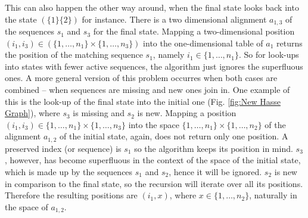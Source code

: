 \documentclass[a4paper,10pt]{thesis}
\begin{document}
{{{{        \gapSmall
        This can also happen the other way around, when the final state looks back into the state $(\{1\}\{2\})$ for instance. There is a two dimensional alignment $a_{1,3}$ of the sequences $s_1$ and $s_3$ for the final state. Mapping a two-dimensional position $(i_1,i_3)\in(\{1,\dots,n_1\}\times\{1,\dots,n_3\})$ into the one-dimensional table of $a_1$ returns the position of the matching sequence $s_1$, namely $i_1\in\{1,\dots,n_1\}$. So for look-ups into states with fewer active sequences, the algorithm just ignores the superfluous ones. 
        \gapSmall
        A more general version of this problem occurres when both cases are combined -- when sequences are missing and new ones join in. One example of this is the look-up of the final state into the initial one (Fig. \ref{fig:New Hasse Graph}), where $s_3$ is missing and $s_2$ is new. Mapping a position $(i_1,i_3)\in\{1,\dots,n_1\}\times\{1,\dots,n_3\}$ into the space $\{1,\dots,n_1\}\times\{1,\dots,n_2\}$ of the alignment $a_{1,2}$ of the initial state, again, does not return only one position. A preserved index (or sequence) is $s_1$ so the algorithm keeps its position in mind. $s_3$, however, has become superfluous in the context of the space of the initial state, which is made up by the sequences $s_1$ and $s_2$, hence it will be ignored. $s_2$ is new in comparison to the final state, so the recursion will iterate over all its positions. Therefore the resulting positions are $(i_1,x)$, where $x\in\{1,\dots,n_2\}$, naturally in the space of $a_{1,2}$.
        }}}}
\end{document}
